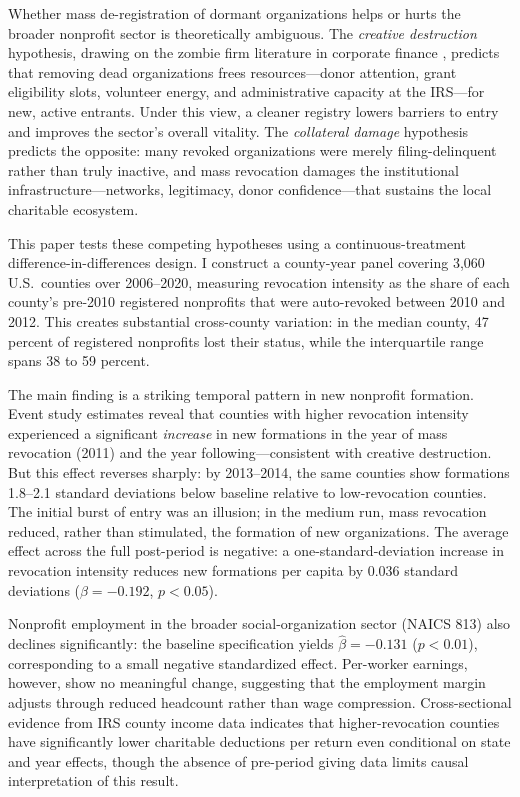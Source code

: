 \documentclass[12pt]{article}
\begin{document}
Whether mass de-registration of dormant organizations helps or hurts the broader nonprofit sector is theoretically ambiguous. The \emph{creative destruction} hypothesis, drawing on the zombie firm literature in corporate finance \citep{caballero2008zombie}, predicts that removing dead organizations frees resources---donor attention, grant eligibility slots, volunteer energy, and administrative capacity at the IRS---for new, active entrants. Under this view, a cleaner registry lowers barriers to entry and improves the sector's overall vitality. The \emph{collateral damage} hypothesis predicts the opposite: many revoked organizations were merely filing-delinquent rather than truly inactive, and mass revocation damages the institutional infrastructure---networks, legitimacy, donor confidence---that sustains the local charitable ecosystem.

This paper tests these competing hypotheses using a continuous-treatment difference-in-differences design. I construct a county-year panel covering 3,060 U.S.\ counties over 2006--2020, measuring revocation intensity as the share of each county's pre-2010 registered nonprofits that were auto-revoked between 2010 and 2012. This creates substantial cross-county variation: in the median county, 47 percent of registered nonprofits lost their status, while the interquartile range spans 38 to 59 percent.

The main finding is a striking temporal pattern in new nonprofit formation. Event study estimates reveal that counties with higher revocation intensity experienced a significant \emph{increase} in new formations in the year of mass revocation (2011) and the year following---consistent with creative destruction. But this effect reverses sharply: by 2013--2014, the same counties show formations 1.8--2.1 standard deviations below baseline relative to low-revocation counties. The initial burst of entry was an illusion; in the medium run, mass revocation reduced, rather than stimulated, the formation of new organizations. The average effect across the full post-period is negative: a one-standard-deviation increase in revocation intensity reduces new formations per capita by 0.036 standard deviations ($\hat{\beta} = -0.192$, $p < 0.05$).

Nonprofit employment in the broader social-organization sector (NAICS 813) also declines significantly: the baseline specification yields $\hat{\beta} = -0.131$ ($p < 0.01$), corresponding to a small negative standardized effect. Per-worker earnings, however, show no meaningful change, suggesting that the employment margin adjusts through reduced headcount rather than wage compression. Cross-sectional evidence from IRS county income data indicates that higher-revocation counties have significantly lower charitable deductions per return even conditional on state and year effects, though the absence of pre-period giving data limits causal interpretation of this result.
\end{document}
